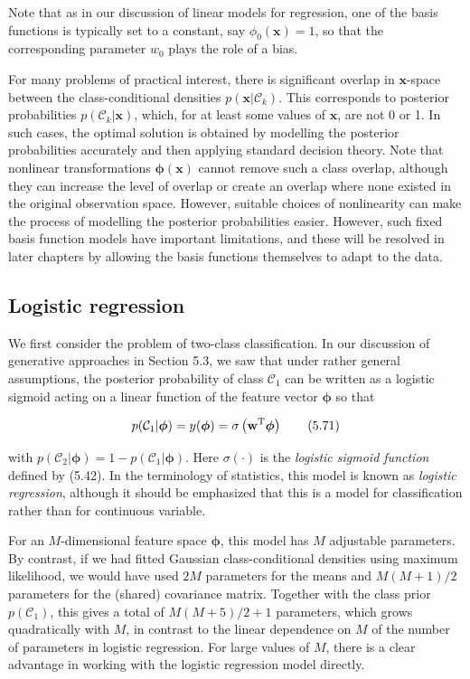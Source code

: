 \documentclass{article}
\begin{document}
Note that as in our discussion of linear models for regression, one of the basis functions is typically set to a constant, say $\phi_{0}(\mathbf{x})=1$, so that the corresponding parameter $w_{0}$ plays the role of a bias.

For many problems of practical interest, there is significant overlap in $\mathbf{x}$-space between the class-conditional densities $p(\mathbf{x}|\mathcal{C}_{k})$. This corresponds to posterior probabilities $p(\mathcal{C}_{k}|\mathbf{x})$, which, for at least some values of $\mathbf{x}$, are not 0 or 1. In such cases, the optimal solution is obtained by modelling the posterior probabilities accurately and then applying standard decision theory. Note that nonlinear transformations $\boldsymbol{\phi}(\mathbf{x})$ cannot remove such a class overlap, although they can increase the level of overlap or create an overlap where none existed in the original observation space. However, suitable choices of nonlinearity can make the process of modelling the posterior probabilities easier. However, such fixed basis function models have important limitations, and these will be resolved in later chapters by allowing the basis functions themselves to adapt to the data.

\subsection{Logistic regression}

We first consider the problem of two-class classification. In our discussion of generative approaches in Section 5.3, we saw that under rather general assumptions, the posterior probability of class $\mathcal{C}_{1}$ can be written as a logistic sigmoid acting on a linear function of the feature vector $\boldsymbol{\phi}$ so that

\begin{equation}
p(\mathcal{C}_{1}|\boldsymbol{\phi})=y(\boldsymbol{\phi})=\sigma\left(\mathbf{w}^{\rm T}\boldsymbol{\phi}\right)
\tag{5.71}
\end{equation}

with $p(\mathcal{C}_{2}|\boldsymbol{\phi})=1-p(\mathcal{C}_{1}|\boldsymbol{\phi})$. Here $\sigma(\cdot)$ is the \textit{logistic sigmoid function} defined by (5.42). In the terminology of statistics, this model is known as \textit{logistic regression}, although it should be emphasized that this is a model for classification rather than for continuous variable.

For an $M$-dimensional feature space $\boldsymbol{\phi}$, this model has $M$ adjustable parameters. By contrast, if we had fitted Gaussian class-conditional densities using maximum likelihood, we would have used $2M$ parameters for the means and $M(M+1)/2$ parameters for the (shared) covariance matrix. Together with the class prior $p(\mathcal{C}_{1})$, this gives a total of $M(M+5)/2+1$ parameters, which grows quadratically with $M$, in contrast to the linear dependence on $M$ of the number of parameters in logistic regression. For large values of $M$, there is a clear advantage in working with the logistic regression model directly.
\end{document}
